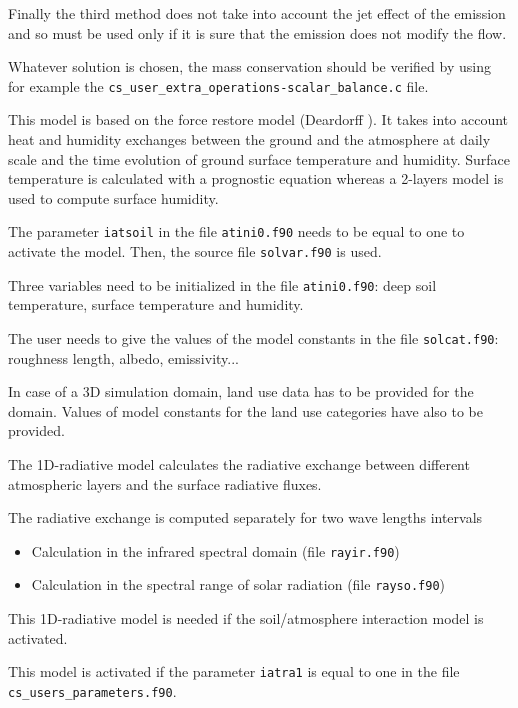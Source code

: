 Finally the third method does not take into account the jet effect of the
emission and so must be used only if it is sure that the emission does not
modify the flow.

Whatever solution is chosen, the mass conservation should be verified by using
for example the
\texttt{cs\_user\_extra\_operations-scalar\_balance.c} file.


This model is based on the force restore model (Deardorff \cite{deardorff}).
It takes into account heat and humidity exchanges between the ground and the
atmosphere at daily scale and the time evolution of ground surface temperature
and humidity. Surface temperature is calculated with a prognostic equation
whereas a 2-layers model is used to compute surface humidity.

The parameter \texttt{iatsoil} in the file \texttt{atini0.f90} needs to be equal to one to
activate the model. Then, the source file \texttt{solvar.f90} is used.

Three variables need to be initialized in the file \texttt{atini0.f90}: deep soil
temperature, surface temperature and humidity.

The user needs to give the values of the model constants in the file
\texttt{solcat.f90}: roughness length, albedo, emissivity...

In case of a 3D simulation domain, land use data has to be provided for the domain.
Values of model constants for the land use categories have also to be
provided.


The 1D-radiative model calculates the radiative exchange between different
atmospheric layers and the surface radiative fluxes.

The radiative exchange is computed separately for two wave lengths intervals

\begin{itemize}
\item Calculation in the infrared spectral domain (file \texttt{rayir.f90})
\item Calculation in the spectral range of solar radiation (file
\texttt{rayso.f90})
\end{itemize}
This 1D-radiative model is needed if the soil/atmosphere interaction model
is activated.

This model is activated if the parameter \texttt{iatra1} is equal to one in the
file \texttt{cs\_users\_parameters.f90}.

